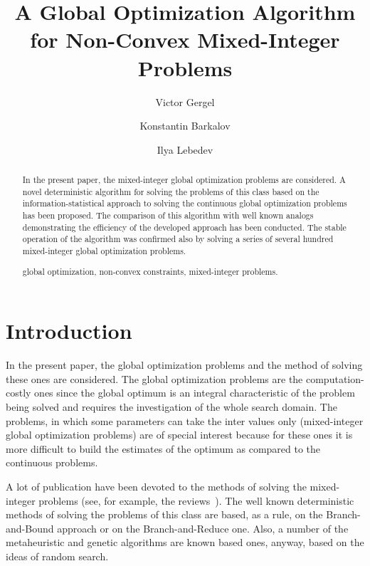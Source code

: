 \documentclass{llncs}
\begin{document}
\mainmatter 

\title{A Global Optimization Algorithm for Non-Convex Mixed-Integer Problems}
\author{Victor Gergel \and Konstantin Barkalov \and Ilya Lebedev %
\\
}


\maketitle

\begin{abstract}
In the present paper, the mixed-integer global optimization problems are considered. A novel 
deterministic algorithm for solving the problems of this class based on the information-statistical 
approach to solving the continuous global optimization problems has been proposed. The 
comparison of this algorithm with well known analogs demonstrating the efficiency of the 
developed approach has been conducted. The stable operation of the algorithm was confirmed 
also by solving a series of several hundred mixed-integer global optimization problems. 

\keywords global optimization, non-convex constraints, mixed-integer problems.

\end{abstract}

\section{Introduction}\label{sec:intro}

In the present paper, the global optimization problems and the method of solving these ones are 
considered. The global optimization problems are the computation-costly ones since the global 
optimum is an integral characteristic of the problem being solved and requires the investigation 
of the whole search domain. 
The problems, in which some parameters can take the inter values only (mixed-integer global 
optimization problems) are of special interest because for these ones it is more difficult to build 
the estimates of the optimum as compared to the continuous problems.

A lot of publication have been devoted to the methods of solving the mixed-integer problems 
(see, for example, the reviews~\cite{Burer,Boukouvala}). The well known deterministic 
methods of solving the problems of this class are based, as a rule, on the Branch-and-Bound 
approach or on the Branch-and-Reduce one. Also, a number of the metaheuristic and genetic 
algorithms are known based 
ones, anyway, based on the ideas of random search.
\end{document}
